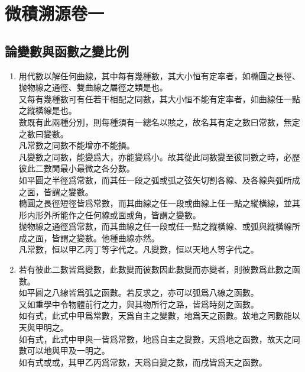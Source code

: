 \chapter {微積溯源卷一}
\setcounter{page}{1}
\section {論變數與函數之變比例}
\thispagestyle{fancy}
\begin{enumerate} [label={第\chinese*款}]
	\item 用代數以解任何曲線，其中每有幾種數，其大小恒有定率者，如橢圓之長徑、抛物線之通徑、雙曲線之屬徑之類是也。\\
	又每有幾種數可有任若干相配之同數，其大小恒不能有定率者，如曲線任一點之縱橫線是也。\\
	數既有此兩種分別，則每種須有一總名以賅之，故名其有定之數曰常數，無定之數曰變數。\\
	凡常數之同數不能增亦不能損。\\
	凡變數之同數，能變爲大，亦能變爲小。故其從此同數變至彼同數之時，必歷彼此二數閒最小最微之各分數。\\
	如平圓之半徑爲常數，而其任一段之弧或弧之弦矢切割各線、及各線與弧所成之面，皆謂之變數。\\
	橢圓之長徑短徑皆爲常數，而其曲線之任一段或曲線上任一點之縱橫線，並其形内形外所能作之任何線或面或角，皆謂之變數。\\
	抛物線之通徑爲常數，而其曲線之任一段或任一點之縱橫線、或弧與縱橫線所成之面，皆謂之變數。他種曲線亦然。\\
	凡常數，恒以甲乙丙丁等字代之。凡變數，恒以天地人等字代之。
	\item 若有彼此二數皆爲變數，此數變而彼數因此數變而亦變者，則彼數爲此數之函數。\\
	如平圓之八線皆爲弧之函數。若反求之，亦可以弧爲八線之函數。\\
	又如重學中令物體前行之力，與其物所行之路，皆爲時刻之函數。\\
	如有式\CJKmove，此式中甲爲常數，天爲自主之變數，地爲天之函數。故地之同數能以天與甲明之。\\
	如有式\CJKmove，此式中甲與一皆爲常數，地爲自主之變數，天爲地之函數，故天之同數可以地與甲及一明之。\\
	如有式\CJKmove 或\CJKmove 或\CJKmove，其甲乙丙爲常數，天爲自變之數，而戌皆爲天之函數。\\

\end{enumerate}
